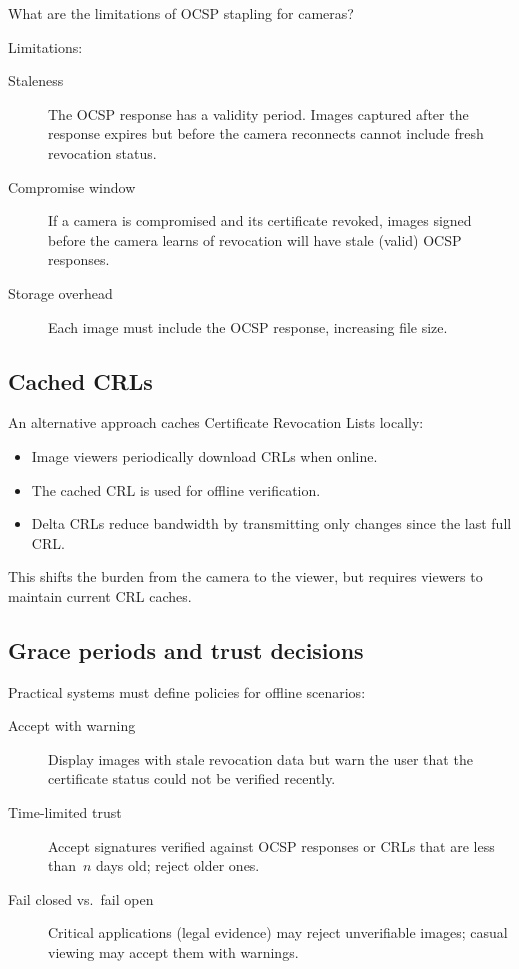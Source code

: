 \begin{exercise}
  What are the limitations of OCSP stapling for cameras?
\end{exercise}

Limitations:
\begin{description}
  \item[Staleness] The OCSP response has a validity period.
    Images captured after the response expires but before the camera reconnects
    cannot include fresh revocation status.
  \item[Compromise window] If a camera is compromised and its certificate
    revoked, images signed before the camera learns of revocation will have
    stale (valid) OCSP responses.
  \item[Storage overhead] Each image must include the OCSP response, increasing
    file size.
\end{description}

\subsection{Cached CRLs}

An alternative approach caches Certificate Revocation Lists locally:
\begin{itemize}
  \item Image viewers periodically download CRLs when online.
  \item The cached CRL is used for offline verification.
  \item Delta CRLs reduce bandwidth by transmitting only changes since the last
    full CRL.
\end{itemize}

This shifts the burden from the camera to the viewer, but requires viewers to
maintain current CRL caches.

\subsection{Grace periods and trust decisions}

Practical systems must define policies for offline scenarios:
\begin{description}
  \item[Accept with warning] Display images with stale revocation data but warn
    the user that the certificate status could not be verified recently.
  \item[Time-limited trust] Accept signatures verified against OCSP responses or
    CRLs that are less than~\(n\) days old; reject older ones.
  \item[Fail closed vs.\ fail open] Critical applications (legal evidence) may
    reject unverifiable images; casual viewing may accept them with warnings.
\end{description}


